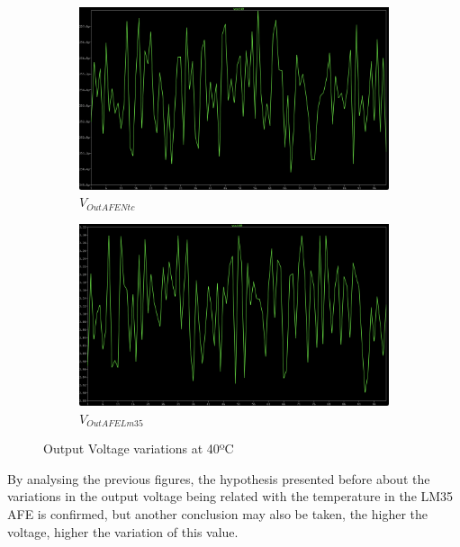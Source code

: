\documentclass[12pt]{article}
\begin{document}
    \begin{figure}[H]
        \centering
        \begin{subfigure}{0.45\textwidth}
            \centering
            \includegraphics[width=\textwidth]{images/vntc40.png}
            \caption{ $V_{OutAFENtc}$ }
        \end{subfigure}\hfill
        \begin{subfigure}{0.45\textwidth}
            \centering
            \includegraphics[width=\textwidth]{images/vlm40.png}
            \caption{$V_{OutAFELm35}$}
        \end{subfigure}
        \caption{Output Voltage variations at 40ºC}
        \label{40ºC - montecarlo}
    

    \end{figure}
    
    By analysing the previous figures, the hypothesis presented before about the variations in the output voltage being related with the 
    temperature in the LM35 AFE is confirmed,
    but another conclusion may also be taken, the higher the voltage, higher the variation of this value.
\end{document}

